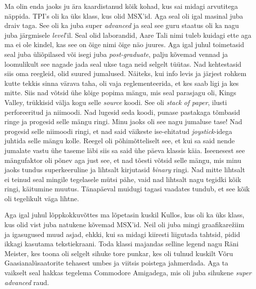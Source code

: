 Ma olin enda jaoks ju ära kaardistanud kõik kohad, kus sai midagi arvutitega 
näppida. TPI's oli ka üks klass, kus olid 
MSX'id. Aga seal oli igal masinal juba draiv taga. 
See oli ka juba super \emph{advanced} ja seal see guru staatus oli ka nagu juba 
järgmisele \emph{level}'il. Seal olid  laborandid, Aare Tali nimi tuleb kuidagi ette aga ma ei ole kindel, kas see on õige nimi õige 
näo juures. Aga igal juhul toimetasid seal juba 
üliõpilased või isegi juba \emph{post-graduate},  palju kõvemad vennad ja 
loomulikult see nagade jada seal ukse taga neid selgelt tüütas. Nad kehtestasid 
siis oma  reegleid, olid suured jumalused. Näiteks, kui info levis ja järjest 
rohkem kutte tekkis sinna värava taha,  oli vaja reglementeerida, et kes saab 
ligi ja kes mitte. Siis nad võtsid ühe kõige popima mängu, mis seal parasjagu 
oli, Kings Valley, trükkisid välja kogu selle 
\emph{source} koodi. See oli \emph{stack of paper}, ilusti perforeeritud ja 
niimoodi. Nad lugesid seda koodi, punase pastakaga tõmbasid ringe ja progesid 
selle mängu ringi. Minu jaoks oli see nagu jumaluse tase! Nad progesid selle 
niimoodi ringi, et nad said väikeste ise-ehitatud \emph{joystick}-idega juhtida 
selle mängu kolle. Reegel oli põhimõtteliselt see, et kui sa said nende 
jumalate vastu ühe taseme läbi siis sa said ühe päeva klassis käia. Iseenesest 
see mängufaktor  oli põnev aga just see, et nad tõesti võtsid selle mängu, mis 
minu jaoks tundus superkeeruline ja lihtsalt kirjutasid \emph{binary} ringi. 
Nad mitte lihtsalt ei teinud seal mingile tegelasele mütsi pähe,  vaid nad 
lihtsalt nagu tegidki kõik ringi, käitumine muutus. Tänapäeval muidugi tagasi 
vaadates tundub, et see kõik oli tegelikult väga lihtne.


Aga igal juhul lõppkokkuvõttes ma lõpetasin kuskil Kullos, kus oli 
ka üks klass, kus olid vist juba natukene kõvemad MSX'id. Neil oli juba  mingi graafikarežiim ja igasugused muud asjad, ehkki, kui 
sa midagi kiiresti liigutada tahtsid, pidid ikkagi kasutama tekstiekraani. Toda 
klassi majandas selline legend nagu Räni Meister, kes 
toona oli selgelt sihuke tore punkar, kes oli tulnud kuskilt Võru 
Gaasianalüsaatorite tehasest umbes ja viitsis poistega jahmerdada. Aga ta 
vaikselt seal hakkas tegelema Commodore 
Amigadega, mis oli juba sihukene 
\emph{super advanced} raud. 

